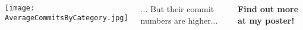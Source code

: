 \documentclass[25pt, a3paper, landscape, margin=10mm, innermargin=15mm, blockverticalspace=15mm, subcolspace=8mm, dvipsnames]{tikzposter} %
\begin{document}
\begin{columns}
{{    \begin{tikzfigure}[]
        \texttt{[image: AverageCommitsByCategory.jpg]}
    \end{tikzfigure}
    
    ... But their commit numbers are higher... 
    
    \vspace{1em}
    \textbf{Find out more at my poster!}
    }
}
\end{columns}
\end{document}
